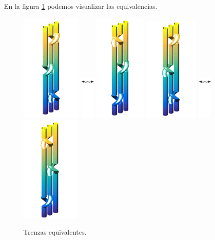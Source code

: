 	En la figura \ref{tren14} podemos visualizar las equivalencias.\\
	\begin{figure}[h!]
		\centering
		\includegraphics[width=3cm]{itrenzas/6c1.png}
		\includegraphics[width=0.7cm]{itrenzas/flechac.png}
		\includegraphics[width=2.6cm]{itrenzas/6c2.png}
		\space	
		\includegraphics[width=2.7cm]{itrenzas/6c3.png}
		\includegraphics[width=0.7cm]{itrenzas/flechac.png}
		\includegraphics[width=2.9cm]{itrenzas/6c4.png}
		\caption{Trenzas equivalentes.}
		\label{tren14} 
	\end{figure}


